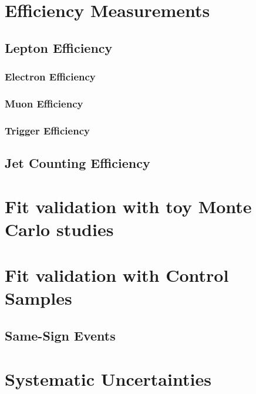 \documentclass{cmspaper}
\begin{document}
\section{Efficiency Measurements}
     \label{sec:alleff}
     \subsection{Lepton Efficiency}
       \label{sec:efficiency}
	 \subsubsection{Electron Efficiency}
	   \label{sec:eff_electron}
	 \subsubsection{Muon Efficiency}
	   \label{sec:eff_muon}
	 \subsubsection{Trigger Efficiency}
	   \label{sec:eff_trigger}
     \subsection{Jet Counting Efficiency}

\section{Fit validation with toy Monte Carlo studies}

\section{Fit validation with Control Samples}
	 \subsection{Same-Sign Events}
	   \label{sec:fitvalidation_ss}


\section{Systematic Uncertainties}
   \label{sec:systematics}

\newpage 
\end{document}
